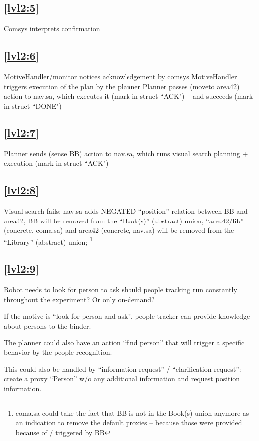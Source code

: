\documentclass{article}
\begin{document}
\subsection{\ref{lvl2:5}} Comsys interprets confirmation


\subsection{\ref{lvl2:6}} MotiveHandler/monitor notices acknowledgement by comsys
	MotiveHandler triggers execution of the plan by the planner
	Planner passes (moveto area42) action to nav.sa, which executes it (mark in struct ``ACK")
	-- and succeeds (mark in struct ``DONE")

\subsection{\ref{lvl2:7}} Planner sends (sense BB) action to nav.sa, which runs 
	visual search planning + execution (mark in struct ``ACK")
	
\subsection{\ref{lvl2:8}} Visual search fails; 
	nav.sa adds NEGATED ``position'' relation between BB and area42;
	BB will be removed from the ``Book(s)'' (abstract) union;
	``area42/lib'' (concrete, coma.sa) and area42 (concrete, nav.sa) will be removed from the ``Library'' (abstract) union;
	\footnote{coma.sa could take the fact that BB is not in the Book(s) union anymore as an
		indication to remove the default proxies -- because those were provided because of
		/ triggered by BB}

\subsection{\ref{lvl2:9}} Robot needs to look for person to ask
	should people tracking run constantly throughout the experiment? Or only on-demand?
	
	If the motive is ``look for person and ask'', people tracker can
	provide knowledge about persons to the binder.
	
	The planner could also have an action ``find person'' that will
	trigger a specific behavior by the people recognition.
	
	This could also be handled by ``information request'' / ``clarification
	request'': create a proxy ``Person'' w/o any additional information and
	request position information.
\end{document}
